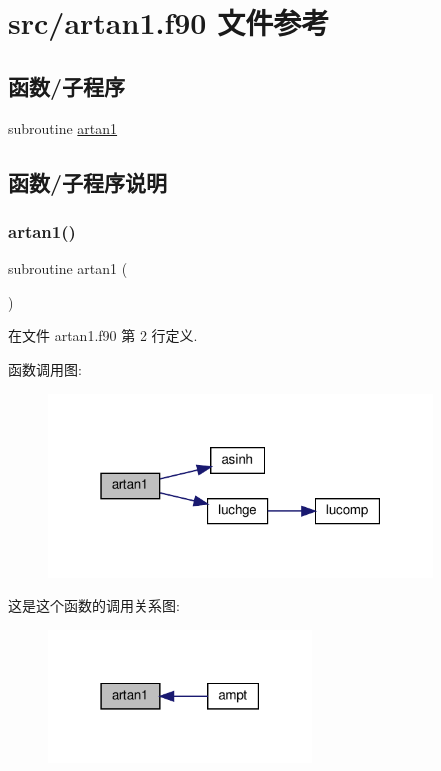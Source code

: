 \hypertarget{artan1_8f90}{}\section{src/artan1.f90 文件参考}
\label{artan1_8f90}
\subsection*{函数/子程序}
\begin{DoxyCompactItemize}
\item 
subroutine \mbox{\hyperlink{artan1_8f90_ad1b12ebb1bf424d969eea2ba7c11890b}{artan1}}
\end{DoxyCompactItemize}


\subsection{函数/子程序说明}
\mbox{\label{artan1_8f90_ad1b12ebb1bf424d969eea2ba7c11890b}} 
\subsubsection{\texorpdfstring{artan1()}{artan1()}}
{\footnotesize\ttfamily subroutine artan1 (\begin{DoxyParamCaption}{ }\end{DoxyParamCaption})}



在文件 artan1.\+f90 第 2 行定义.

函数调用图\+:
\nopagebreak
\begin{figure}[H]
\begin{center}
\leavevmode
\includegraphics[width=289pt]{artan1_8f90_ad1b12ebb1bf424d969eea2ba7c11890b_cgraph}
\end{center}
\end{figure}
这是这个函数的调用关系图\+:
\nopagebreak
\begin{figure}[H]
\begin{center}
\leavevmode
\includegraphics[width=198pt]{artan1_8f90_ad1b12ebb1bf424d969eea2ba7c11890b_icgraph}
\end{center}
\end{figure}
